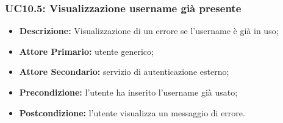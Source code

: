 \subsubsection{UC10.5: Visualizzazione username già presente}
\label{sec:UC10.5}
\begin{itemize}
    \item \textbf{Descrizione:} Visualizzazione di un errore se l'username è già in uso;
    \item \textbf{Attore Primario:} utente generico;
    \item \textbf{Attore Secondario:} servizio di autenticazione esterno;
    \item \textbf{Precondizione:} l'utente ha inserito l'username già usato;
    \item \textbf{Postcondizione:} l'utente visualizza un messaggio di errore. 
\end{itemize}